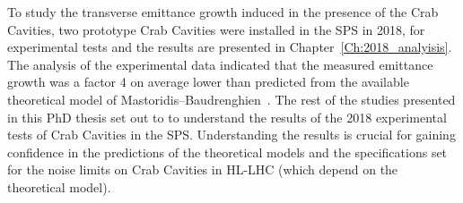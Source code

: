 
To study the transverse emittance growth induced in the presence of the Crab Cavities, two prototype Crab Cavities were installed in the SPS in 2018, for experimental tests and the results are presented in Chapter~\ref{Ch:2018_analyisis}. The analysis of the experimental data indicated that the measured emittance growth was a factor 4 on average lower than predicted from the available theoretical model of Mastoridis--Baudrenghien~\cite{PhysRevSTAB.18.101001}. The rest of the studies presented in this PhD thesis set out to to understand the results of the 2018 experimental tests of Crab Cavities in the SPS. Understanding the results is crucial for gaining confidence in the predictions of the theoretical models and the specifications set for the noise limits on Crab Cavities in HL-LHC (which depend on the theoretical model).


